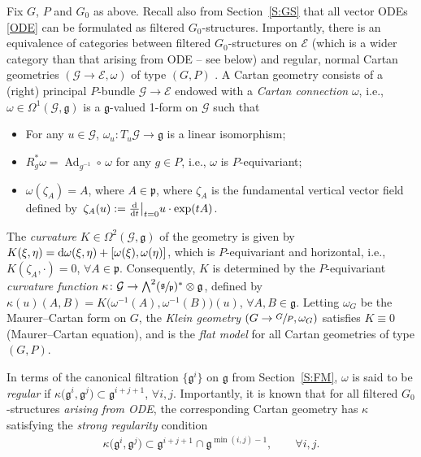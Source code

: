 \documentclass[pdftex]{sigma}%
\newcommand\tensor{\otimes}
\newcommand{\g}{\mathfrak{g}}
\newcommand\cG{\mathcal{G}}
\newcommand\Ad{\operatorname{Ad}}
\newcommand\fg{\mathfrak{g}}
\newcommand\fp{\mathfrak{p}}
\newcommand\cE{\mathcal{E}}
\numberwithin{equation}{section}
\begin{document}
Fix $G$, $P$ and $G_0$ as above. Recall also from Section~\ref{S:GS} that all vector ODEs \eqref{ODE} can be formulated as filtered $G_0$-structures. Importantly, there is an equivalence of categories between filtered $G_0$-structures on $\cE$ (which is a wider category than that arising from ODE -- see below) and regular, normal Cartan geometries $(\cG \to \cE, \omega)$ of type $(G,P)$ \cite{CDT2020, DKM1999}. A Cartan geometry consists of a (right) principal $P$-bundle $\cG \to \cE$ endowed with a {\em Cartan connection} $\omega$, i.e., $\omega \in \Omega^1(\cG,\g)$ is a $\g$-valued 1-form on $\cG$ such that
\begin{itemize}\itemsep=0pt
\item[(a)] For any $u \in \cG$, $\omega_u\colon T_u \cG \to \fg$ is a linear isomorphism;
\item[(b)] $R_g^{\ast}\omega = \Ad_{g^{-1}} \circ\, \omega$ for any $g \in P$, i.e., $\omega$ is $P$-equivariant;
\item[(c)] $\omega(\zeta_A) = A$, where $A \in \mathfrak{p}$, where $\zeta_A$ is the fundamental vertical vector field defined by~$\zeta_A(u) := \frac{{\rm d}}{{\rm d}t}{\big|}_{t=0} u\cdot\exp(tA)$.
\end{itemize}

The {\em curvature} $K \in \Omega^2(\cG,\g)$ of the geometry is given by $K(\xi, \eta) = {\rm d}\omega(\xi, \eta) + [\omega(\xi),\omega(\eta)]$, which is $P$-equivariant and horizontal, i.e., $K(\zeta_A,\cdot) = 0$, $\forall A \in \fp$. Consequently, $K$ is determined by the $P$-equivariant {\em curvature function} $\kappa\colon \cG \to \bigwedge^2(\sfrac{\g}{\fp})^{\ast}\tensor \g$, defined by
$\kappa (u)(A, B) = K\bigl(\omega^{-1}(A),\omega^{-1}(B)\bigr)(u)$, $\forall A,B \in \g$. Letting $\omega_G$ be the Maurer--Cartan form on $G$, the {\em Klein geometry} $(G \to \sfrac{G}{P}, \omega_G)$ satisfies $K \equiv 0$ (Maurer--Cartan equation), and is the {\em flat model} for all Cartan geometries of type $(G,P)$.

 In terms of the canonical filtration $\bigl\{ \g^i \bigr\}$ on $\g$ from Section~\ref{S:FM}, $\omega$ is said to be {\em regular} if $\kappa \bigl(\g^i, \g^j\bigr) \subset \g^{i+j+1}$, $\forall i,j$. Importantly, it is known that for all filtered $G_0$-structures {\em arising from ODE}, the corresponding Cartan geometry has $\kappa$ satisfying the {\em strong regularity} condition \cite[Remark~2.3]{CDT2020}
 \begin{align}\label{E:SR}
 \kappa \bigl(\g^i, \g^j\bigr) \subset \g^{i+j+1} \cap \g^{\min(i,j)-1},\qquad
\forall i,j.
 \end{align}
\end{document}
